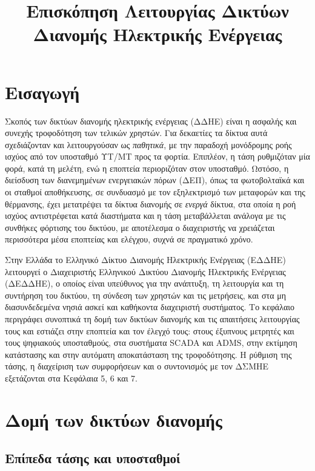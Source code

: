 \title{Επισκόπηση Λειτουργίας Δικτύων Διανομής Ηλεκτρικής Ενέργειας}

\section{Εισαγωγή}
\label{kef-04-theoria}

Σκοπός των δικτύων διανομής ηλεκτρικής ενέργειας (ΔΔΗΕ) είναι η ασφαλής και συνεχής
τροφοδότηση των τελικών χρηστών. Για δεκαετίες τα δίκτυα αυτά σχεδιάζονταν και λειτουργούσαν
ως \emph{παθητικά}, με την παραδοχή μονόδρομης ροής ισχύος από τον υποσταθμό ΥΤ/ΜΤ
προς τα φορτία. Επιπλέον, η τάση ρυθμιζόταν μία φορά, κατά τη μελέτη, ενώ η εποπτεία
περιοριζόταν στον υποσταθμό. Ωστόσο, η διείσδυση των διανεμημένων ενεργειακών πόρων (ΔΕΠ),
όπως τα φωτοβολταϊκά και οι σταθμοί αποθήκευσης, σε συνδυασμό με τον εξηλεκτρισμό των
μεταφορών και της θέρμανσης, έχει μετατρέψει τα δίκτυα διανομής σε \emph{ενεργά} δίκτυα, στα
οποία η ροή ισχύος αντιστρέφεται κατά διαστήματα και η τάση μεταβάλλεται ανάλογα με τις συνθήκες φόρτισης του δικτύου, με αποτέλεσμα ο διαχειριστής να χρειάζεται περισσότερα μέσα εποπτείας και
ελέγχου, συχνά σε πραγματικό χρόνο.

Στην Ελλάδα το Ελληνικό Δίκτυο Διανομής Ηλεκτρικής Ενέργειας (ΕΔΔΗΕ) λειτουργεί ο
Διαχειριστής Ελληνικού Δικτύου Διανομής Ηλεκτρικής Ενέργειας (ΔΕΔΔΗΕ), ο οποίος είναι
υπεύθυνος για την ανάπτυξη, τη λειτουργία και τη συντήρηση του δικτύου, τη σύνδεση των χρηστών
και τις μετρήσεις, και στα μη διασυνδεδεμένα νησιά ασκεί και καθήκοντα διαχειριστή συστήματος.
Το κεφάλαιο περιγράφει συνοπτικά τη δομή των δικτύων διανομής και τις απαιτήσεις λειτουργίας
τους και εστιάζει στην εποπτεία και τον έλεγχό τους: στους έξυπνους μετρητές και τους
ψηφιακούς υποσταθμούς, στα συστήματα SCADA και ADMS, στην εκτίμηση κατάστασης και στην
αυτόματη αποκατάσταση της τροφοδότησης. Η ρύθμιση της τάσης, η διαχείριση των συμφορήσεων και ο
συντονισμός με τον ΔΣΜΗΕ εξετάζονται στα
Κεφάλαια 5, 6 και
7.

\section{Δομή των δικτύων διανομής}
\label{sec:dn-structure}

\subsection{Επίπεδα τάσης και υποσταθμοί}
\label{sec:dn-levels}


